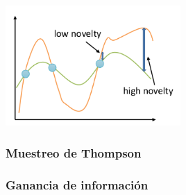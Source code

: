 \begin{center}
\includegraphics[width=0.5\textwidth]{figures/2020-07-14-181819_342x235_scrot.png}
\end{center}

\subsubsection{Muestreo de Thompson}%
\label{ssub:muestreo_de_thompson}

\subsubsection{Ganancia de información}%
\label{ssub:ganancia_de_información}




